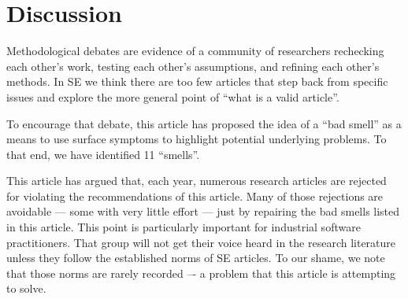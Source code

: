 \documentclass[preprint,10pt]{elsarticle}
\begin{document}

\section{Discussion} \label{Sec:Disc}

Methodological debates are evidence of a community of researchers rechecking each other's work, testing each other's assumptions, and refining each other's methods. 
In SE we think there are too few articles that step back from specific issues and explore the more general point of ``what is a valid article''.

To encourage that debate, this article has proposed the idea of a ``bad smell'' as a means to use surface symptoms to highlight potential underlying problems.  To that end, we have identified 11 ``smells''.

This article has argued that, each year, numerous research articles are rejected for violating the recommendations of this article. Many of those rejections are avoidable --- some with very little effort --- just by repairing the bad smells listed in this article. This point is particularly important
for industrial software practitioners. That group will not get their voice heard in the research literature unless they follow the established norms of SE articles. To our shame, we note that those norms are rarely recorded –- a problem that this article is attempting to solve.
\end{document}
